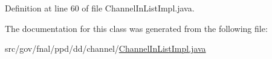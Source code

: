 Definition at line 60 of file Channel\-In\-List\-Impl.\-java.



The documentation for this class was generated from the following file\-:\begin{DoxyCompactItemize}
\item 
src/gov/fnal/ppd/dd/channel/\hyperlink{ChannelInListImpl_8java}{Channel\-In\-List\-Impl.\-java}\end{DoxyCompactItemize}
